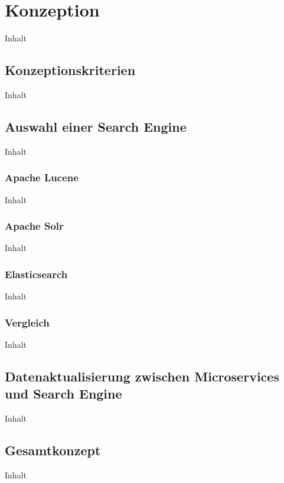 \chapter{Konzeption\label{chap4:Viertes-Kapitel}}

Inhalt

\section{Konzeptionskriterien\label{sec4.1:Unterpunkt-1}}

Inhalt

\section{Auswahl einer Search Engine\label{sec4.2:Unterpunkt-2}}

Inhalt

\subsection{Apache Lucene\label{subsec4.2.1:Unterunterpunkt-1}}

Inhalt

\subsection{Apache Solr\label{subsec4.2.2:Unterunterpunkt-2}}

Inhalt

\subsection{Elasticsearch\label{subsec4.2.3:Unterunterpunkt-3}}

Inhalt

\subsection{Vergleich\label{subsec4.2.4:Unterunterpunkt-4}}

Inhalt

\section{Datenaktualisierung zwischen Microservices und Search Engine\label{sec4.3:Unterpunkt-3}}

Inhalt

\section{Gesamtkonzept\label{sec4.4:Unterpunkt-4}}

Inhalt